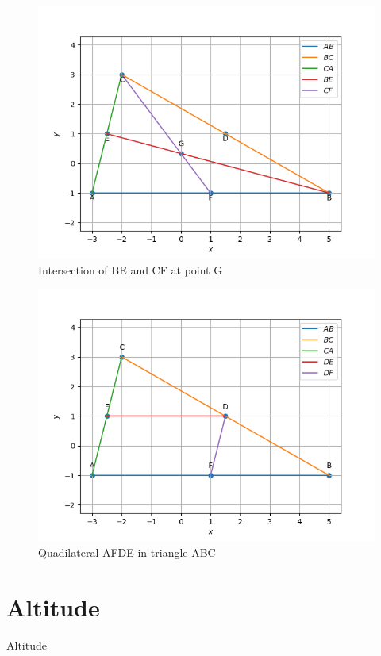 \documentclass[journal,12pt,twocolumn]{IEEEtran}
\theoremstyle{remark}
\begin{document}
\begin{figure}[!ht]
              \centering
              \includegraphics[width=\columnwidth]{./figs/fig1.2.3.png}
              \caption{Intersection of BE and CF at point G}
              \label{fig:5}
\end{figure}
\begin{figure}[!ht]
              \centering
              \includegraphics[width=\columnwidth]{./figs/fig1.2.7.png}
              \caption{Quadilateral AFDE in triangle ABC}
              \label{fig:6}
\end{figure}


\section{Altitude}
\begin{table}[!ht]
	
	\caption{Altitude}
	\label{tab:Altitude}	
\end{table}
\end{document}
